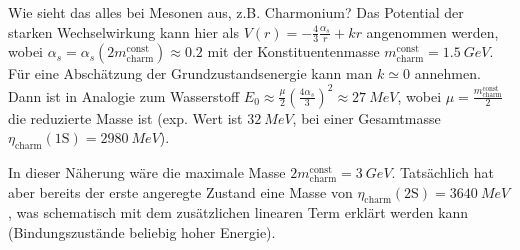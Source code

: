 \begin{fquestion}{Wie sieht das alles bei Mesonen aus, z.B. Charmonium?}
    Das Potential der starken Wechselwirkung kann hier als $V(r) = -\frac{4}{3} \frac{\alpha_s}{r} + kr$ angenommen werden, wobei $\alpha_s = \alpha_s(2m_\mathrm{charm}^\mathrm{const}) \approx 0.2$ mit der Konstituentenmasse $m_\mathrm{charm}^\mathrm{const} = \SI{1.5}{GeV}$.
    Für eine Abschätzung der Grundzustandsenergie kann man $k\simeq 0$ annehmen.
    Dann ist in Analogie zum Wasserstoff $E_0\approx \frac{\mu }{2}\left(\frac{4\alpha_s}{3} \right)^2 \approx \SI{27}{MeV} $, wobei $\mu = \frac{m_\mathrm{charm}^\mathrm{const}}{2}$ die reduzierte Masse ist (exp. Wert ist $\SI{32}{MeV}$, bei einer Gesamtmasse $\eta_\mathrm{charm}(1\mathrm{S} ) = \SI{2980}{MeV}$).
    
    In dieser Näherung wäre die maximale Masse $2m_\mathrm{charm}^\mathrm{const} = \SI{3}{GeV}$.
    Tatsächlich hat aber bereits der erste angeregte Zustand eine Masse von $\eta_\mathrm{charm}(2\mathrm{S} ) = \SI{3640}{MeV}$, was schematisch mit dem zusätzlichen linearen Term erklärt werden kann (Bindungszustände beliebig hoher Energie).
    
\end{fquestion}

